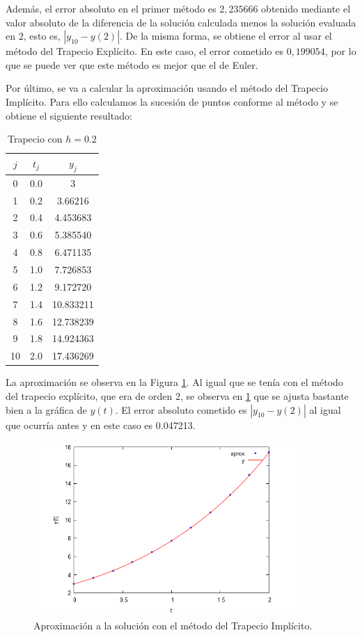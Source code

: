 \documentclass{article}
\theoremstyle{theorem-style}  %
\theoremstyle{definition-style}
\theoremstyle{example-style}
\begin{document}
Además, el error absoluto en el primer método es $2,235666$ obtenido mediante el valor absoluto de la diferencia de la solución calculada menos la solución evaluada en $2$, esto es, $|y_{10} - y(2)|$. De la misma forma, se obtiene el error al usar el método del Trapecio Explícito. En este caso, el error cometido es $0,199054$, por lo que se puede ver que este método es mejor que el de Euler.

Por último, se va a calcular la aproximación usando el método del Trapecio Implícito. Para ello calculamos la sucesión de puntos conforme al método y se obtiene el siguiente resultado:

	\begin{table}[H]
		\centering
		\begin{tabular}{|| c | c | c ||}
			\hline
			\hline $j$ &  $t_j $ & $y_j$\\
			\hline 0 & 0.0 & 3 \\
			\hline 1 & 0.2 & 3.66216  \\
			\hline 2 & 0.4 & 4.453683 \\
			\hline 3 & 0.6 & 5.385540 \\
			\hline 4 & 0.8 & 6.471135 \\
			\hline 5 & 1.0 & 7.726853 \\
			\hline 6 & 1.2 & 9.172720 \\
			\hline 7 & 1.4 & 10.833211 \\
			\hline 8 & 1.6 & 12.738239 \\
			\hline 9 & 1.8 & 14.924363 \\
			\hline 10 & 2.0 & 17.436269 \\
		\end{tabular}
		\caption{Trapecio con $h=0.2$}
		\label{table:trapecio-ejtp1.3}
	\end{table}

La aproximación se observa en la Figura \ref{fig:aprox3}. Al igual que se tenía con el método del trapecio explícito, que era de orden 2, se observa en \ref{fig:aprox3} que se ajusta bastante bien a la gráfica de $y(t)$. El error absoluto cometido es $|y_{10} - y(2)|$ al igual que ocurría antes y en este caso es 0.047213.

	\begin{figure}[h]
		\centering
		\includegraphics[width=10cm]{./Images/ej1-3.png}
		\caption{Aproximación a la solución con el método del Trapecio Implícito.}
		\label{fig:aprox3}

	\end{figure}
\end{document}
